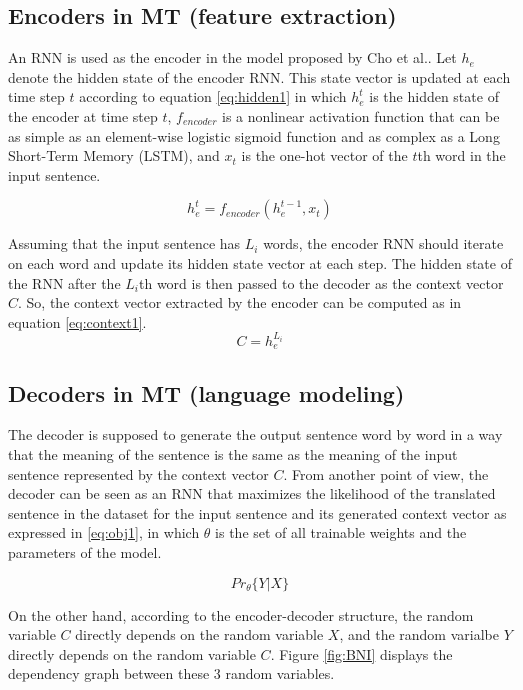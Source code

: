 \documentclass[preprint, 12pt]{elsarticle}
\begin{document}
		\subsection{Encoders in MT (feature extraction)}
		An RNN is used as the encoder in the model proposed by Cho et al.\cite{cho2014learning}. Let $h_e$ denote the hidden state of the encoder RNN. This state vector is updated at each time step $t$ according to equation \eqref{eq:hidden1} in which $h_e^t$ is the hidden state of the encoder at time step $t$, $f_{encoder}$ is a nonlinear activation function that can be as simple as an element-wise logistic sigmoid function and as complex as a Long Short-Term Memory (LSTM), and $x_t$ is the one-hot vector of the $t$th word in the input sentence.
		
		\begin{equation}
			h_e^t = f_{encoder}(h_e^{t-1}, x_t)
			\label{eq:hidden1}
		\end{equation}
		
		Assuming that the input sentence has $L_i$ words, the encoder RNN should iterate on each word and update its hidden state vector at each step. The hidden state of the RNN after the $L_i$th word is then passed to the decoder as the context vector $C$. So, the context vector extracted by the encoder can be computed as in equation \eqref{eq:context1}.
		\begin{equation}
			C = h_e^{L_i}
			\label{eq:context1}
		\end{equation}
		\subsection{Decoders in MT (language modeling)}
		The decoder is supposed to generate the output sentence word by word in a way that the meaning of the sentence is the same as the meaning of the input sentence represented by the context vector $C$. From another point of view, the decoder can be seen as an RNN  that maximizes the likelihood of the translated sentence in the dataset for the input sentence and its generated context vector as expressed in \eqref{eq:obj1}, in which $\theta$ is the set of all trainable weights and the parameters of the model.
		
		\begin{equation}
			Pr_\theta\{Y | X\}
			\label{eq:obj1}
		\end{equation}
		
		On the other hand, according to the encoder-decoder structure, the random variable $C$ directly depends on the random variable $X$, and the random varialbe $Y$ directly depends on the random variable $C$. Figure \ref{fig:BNI} displays the dependency graph between these 3 random variables.
		
\end{document}
